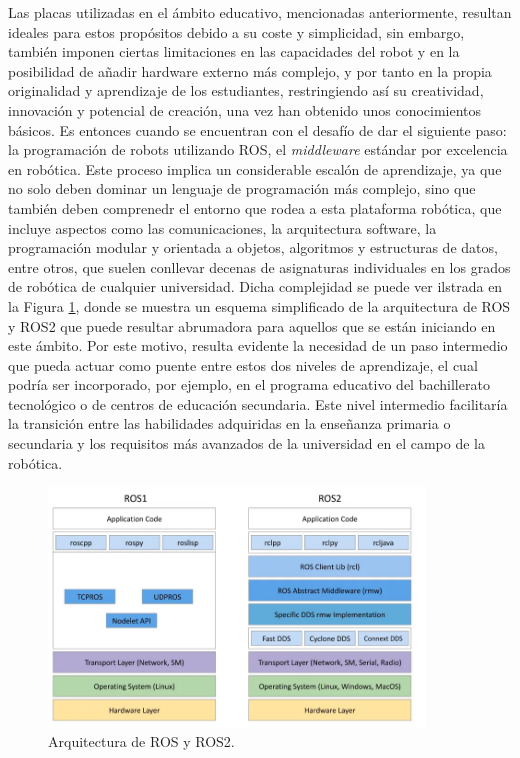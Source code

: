 Las placas utilizadas en el ámbito educativo, mencionadas anteriormente,
resultan ideales para estos propósitos debido a su coste y simplicidad, sin
embargo, también imponen ciertas limitaciones en las capacidades del robot y en
la posibilidad de añadir hardware externo más complejo, y por tanto en la propia
originalidad y aprendizaje de los estudiantes, restringiendo así su creatividad,
innovación y potencial de creación, una vez han obtenido unos conocimientos
básicos.
Es entonces cuando se encuentran con el desafío de dar el siguiente paso: la
programación de robots utilizando ROS, el \textit{middleware} estándar por
excelencia en robótica.
Este proceso implica un considerable escalón de aprendizaje, ya que no solo
deben dominar un lenguaje de programación más complejo, sino que también deben
comprenedr el entorno que rodea a esta plataforma robótica, que incluye aspectos
como las comunicaciones, la arquitectura software, la programación modular y
orientada a objetos, algoritmos y estructuras de datos, entre otros, que suelen
conllevar decenas de asignaturas individuales en los grados de robótica de
cualquier universidad.
Dicha complejidad se puede ver ilstrada en la Figura \ref{fig:ros}, donde se
muestra un esquema simplificado de la arquitectura de ROS y ROS2 que puede
resultar abrumadora para aquellos que se están iniciando en este ámbito.
Por este motivo, resulta evidente la necesidad de un paso intermedio que pueda
actuar como puente entre estos dos niveles de aprendizaje, el cual podría ser
incorporado, por ejemplo, en el programa educativo del bachillerato tecnológico
o de centros de educación secundaria.
Este nivel intermedio facilitaría la transición entre las habilidades adquiridas
en la enseñanza primaria o secundaria y los requisitos más avanzados de la
universidad en el campo de la robótica.

\begin{figure} [h!]
  \begin{center}
    \includegraphics[width=10cm]{figs/ROS_and_ROS2}
  \end{center}
  \caption{Arquitectura de ROS y ROS2.}
  \label{fig:ros}
\end{figure}\

